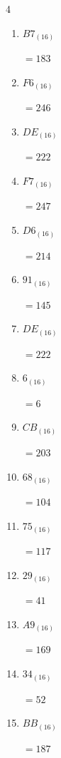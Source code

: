 \newpage
\resetdrill

\begin{multicols}{4}
\begin{enumerate}
  \itemsep=10pt
  \item $B7_{(16)}$

        $=183$

  \item $F6_{(16)}$

        $=246$

  \item $DE_{(16)}$

        $=222$

  \item $F7_{(16)}$

        $=247$

  \item $D6_{(16)}$

        $=214$

  \item $91_{(16)}$

        $=145$

  \item $DE_{(16)}$

        $=222$

  \item $6_{(16)}$

        $=6$

  \item $CB_{(16)}$

        $=203$

  \item $68_{(16)}$

        $=104$

  \item $75_{(16)}$

        $=117$

  \item $29_{(16)}$

        $=41$

  \item $A9_{(16)}$

        $=169$

  \item $34_{(16)}$

        $=52$

  \item $BB_{(16)}$

        $=187$

\columnbreak %


\end{enumerate}
\end{multicols}
